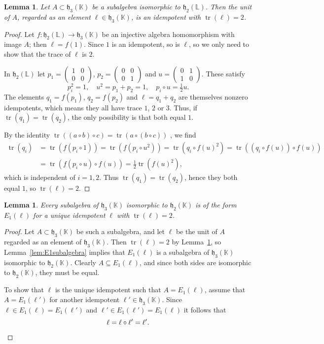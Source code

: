 \documentclass{article}
\theoremstyle{plain}
\newtheorem{lem}[thm]{Lemma}
\theoremstyle{remark}
\theoremstyle{definition}
\newcommand{\maps}{\colon}    %
\newcommand{\tr}{\operatorname{tr}}
\newcommand{\K}{{\mathbb K}}   %
\renewcommand{\L}{{\mathbb L}}   %
\newcommand{\h}{\mathfrak{h}}  %
\begin{document}
\begin{lem}
\label{lem:unitisline}
Let $A\subset\h_3(\K)$ be a subalgebra isomorphic to 
$\h_2(\L)$. Then the unit of $A$, regarded as an element $\ell \in \h_3(\K)$, is an idempotent with $\tr(\ell)=2$.
\end{lem}
\begin{proof}
Let $f\maps\h_2(\L)\to\h_3(\K)$ be an injective algebra homomorphism with image $A$; then $\ell=f(1)$.   Since $1$ is an idempotent, so is $\ell$, so we only need to show that the trace of $\ell$ is $2$.

In $\h_2(\L)$ let $p_1=(\begin{smallmatrix}1&0\\0&0\end{smallmatrix})$, $p_2=(\begin{smallmatrix}0&0\\0&1\end{smallmatrix})$ and $u=(\begin{smallmatrix}0&1\\1&0\end{smallmatrix})$. These satisfy
\[
p_i^2 = 1, \quad
u^2 = p_1+p_2  =1, \quad
p_i\circ u =\tfrac{1}{2} u.
\]
The elements $q_1=f(p_1)$, $q_2=f(p_2)$ and $\ell=q_1+q_2$ are themselves nonzero idempotents, which means they all have trace $1$, $2$ or $3$.  Thus, if $\tr(q_1)=\tr(q_2)$, the only possibility is that both equal $1$.
 
By the identity $\tr((a \circ b) \circ c) = \tr(a \circ (b \circ c))$ \cite[Prop. II.4.3]{FarautKoranyi}, we find
\begin{align*}
\tr(q_i)&=\tr(f(p_i\circ 1))=\tr(f(p_i\circ u^2)) =
\tr (q_i\circ f(u)^2)=\tr((q_i\circ f(u))\circ f(u))\\
&=\tr(f(p_i\circ u)\circ f(u))=\tfrac12\tr(f(u)^2),
\end{align*}
which is independent of $i=1,2$. Thus $\tr(q_1)=\tr(q_2)$, hence they both equal $1$, so $\tr(\ell)=2$.
\end{proof}

\begin{lem}
\label{lem:subalgebraE1}
Every subalgebra of $\h_3(\K)$ isomorphic to $\h_2(\K)$ is of the form $E_1(\ell)$ for a unique idempotent $\ell$ with $\tr(\ell)=2$.
\end{lem}
\begin{proof}
Let $A\subset\h_3(\K)$ be such a subalgebra, and let $\ell$ be the unit of $A$ regarded as an element of $\h_3(\K)$. Then $\tr(\ell)=2$ by Lemma~\ref{lem:unitisline}, so Lemma~\ref{lem:E1subalgebra} implies that $E_1(\ell)$ is a subalgebra of $\h_3(\K)$ isomorphic to $\h_2(\K)$. Clearly $A\subseteq E_1(\ell)$, and since both sides are isomorphic to $\h_2(\K)$, they must be equal.

To show that $\ell$ is the unique idempotent such that $A=E_1(\ell)$, assume that $A=E_1(\ell')$ for another idempotent $\ell'\in\h_3(\K)$. Since $\ell\in E_1(\ell)=E_1(\ell')$ and $\ell'\in E_1(\ell')=E_1(\ell)$ it follows that
\[\ell=\ell\circ\ell'=\ell'. \qedhere \]
\end{proof}
\end{document}
